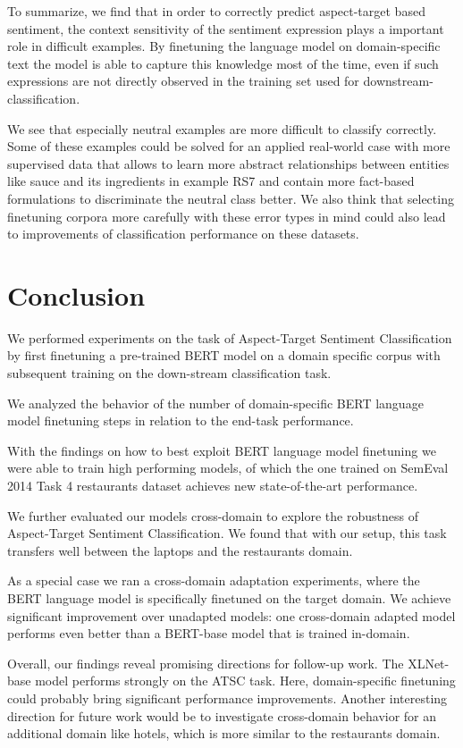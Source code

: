 \documentclass[11pt,a4paper]{article}
\newcommand{\rood}[1]{}
\begin{document}
To summarize, we find that in order to correctly predict aspect-target based sentiment, 
the context sensitivity of the sentiment expression plays a important role in difficult examples. 
By finetuning the language model on domain-specific text the model is able to capture this knowledge most of the time, even if such expressions are not directly observed in the training set used for downstream-classification.

We see that especially neutral examples are more difficult to classify correctly. Some of these examples could be solved for an applied real-world case with more supervised data that allows to learn more abstract relationships between entities like sauce and its ingredients in example RS7 and contain more fact-based formulations to discriminate the neutral class better.
We also think that selecting finetuning corpora more carefully with these error types in mind could also lead to improvements of classification performance on these datasets.

\section{Conclusion}
\label{sect:Conclusion}
\rood{Abstract in Past-Tense without motivation}

We performed experiments on the task of Aspect-Target Sentiment Classification
by first finetuning a pre-trained BERT model on a domain specific corpus with subsequent training on the down-stream classification task.

We analyzed the behavior of the number of domain-specific BERT language model finetuning steps in relation to the end-task performance.

With the findings on how to best exploit BERT language model finetuning we were able
to train high performing models, of which the one trained on SemEval 2014 Task 4 restaurants dataset achieves new state-of-the-art performance.

We further evaluated our models cross-domain to explore the robustness of Aspect-Target Sentiment Classification. We found that with our setup, this task transfers 
well between the laptops and the restaurants domain.

As a special case we ran a cross-domain adaptation experiments, where
the BERT language model is specifically finetuned on the target domain.
We achieve significant improvement over unadapted models: one cross-domain adapted model performs even better than a BERT-base model that is trained in-domain.

Overall, our findings reveal promising directions for follow-up work. The XLNet-base model performs strongly on the ATSC task. Here, domain-specific finetuning could probably bring significant performance improvements. 
Another interesting direction for future work would be to investigate cross-domain behavior for an additional domain like hotels, which is more similar to the restaurants domain.






\appendix
\end{document}
